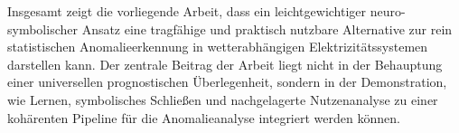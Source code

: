 Insgesamt zeigt die vorliegende Arbeit, dass ein leichtgewichtiger neuro-symbolischer Ansatz eine tragfähige und praktisch nutzbare Alternative zur rein statistischen Anomalieerkennung in wetterabhängigen Elektrizitätssystemen darstellen kann. Der zentrale Beitrag der Arbeit liegt nicht in der Behauptung einer universellen prognostischen Überlegenheit, sondern in der Demonstration, wie Lernen, symbolisches Schließen und nachgelagerte Nutzenanalyse zu einer kohärenten Pipeline für die Anomalieanalyse integriert werden können.